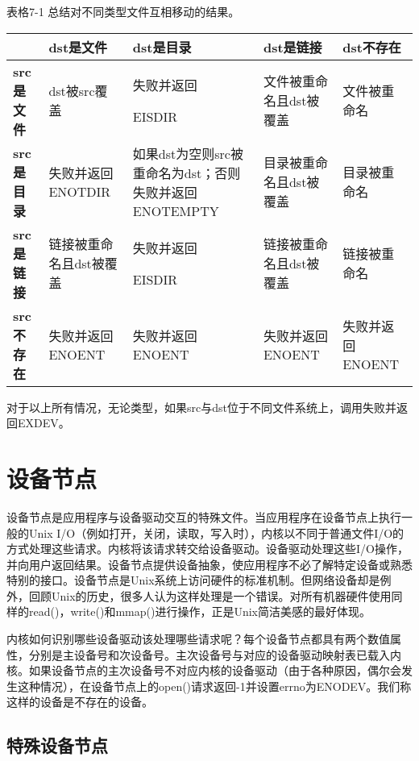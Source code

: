 \begin{center}
表格7-1 总结对不同类型文件互相移动的结果。
\end{center}
\begin{center}
\begin{tabular}{p{2cm}p{2.8cm}p{2.8cm}p{2.8cm}p{2.8cm}}\toprule
\rowcolor[gray]{.9}
 & \textbf{dst是文件} & \textbf{dst是目录} & \textbf{dst是链接} & \textbf{dst不存在}\\ \midrule
\textbf{src是文件} & dst被src覆盖 & 失败并返回

EISDIR & 文件被重命名且dst被覆盖 & 文件被重命名\\
\textbf{src是目录} & 失败并返回ENOTDIR & 如果dst为空则src被重命名为dst；否则失败并返回ENOTEMPTY & 目录被重命名且dst被覆盖 & 目录被重命名\\
\textbf{src是链接} & 链接被重命名且dst被覆盖 & 失败并返回

EISDIR & 链接被重命名且dst被覆盖 & 链接被重命名\\
\textbf{src不存在} & 失败并返回ENOENT & 失败并返回ENOENT & 失败并返回ENOENT & 失败并返回ENOENT\\ \bottomrule
\end{tabular}
\end{center}

对于以上所有情况，无论类型，如果src与dst位于不同文件系统上，调用失败并返回EXDEV。

\section{设备节点}

设备节点是应用程序与设备驱动交互的特殊文件。当应用程序在设备节点上执行一般的Unix I/O（例如打开，关闭，读取，写入时），内核以不同于普通文件I/O的方式处理这些请求。内核将该请求转交给设备驱动。设备驱动处理这些I/O操作，并向用户返回结果。设备节点提供设备抽象，使应用程序不必了解特定设备或熟悉特别的接口。设备节点是Unix系统上访问硬件的标准机制。但网络设备却是例外，回顾Unix的历史，很多人认为这样处理是一个错误。对所有机器硬件使用同样的read()，write()和mmap()进行操作，正是Unix简洁美感的最好体现。

内核如何识别哪些设备驱动该处理哪些请求呢？每个设备节点都具有两个数值属性，分别是主设备号和次设备号。主次设备号与对应的设备驱动映射表已载入内核。如果设备节点的主次设备号不对应内核的设备驱动（由于各种原因，偶尔会发生这种情况），在设备节点上的open()请求返回-1并设置errno为ENODEV。我们称这样的设备是不存在的设备。

\subsection{特殊设备节点}


